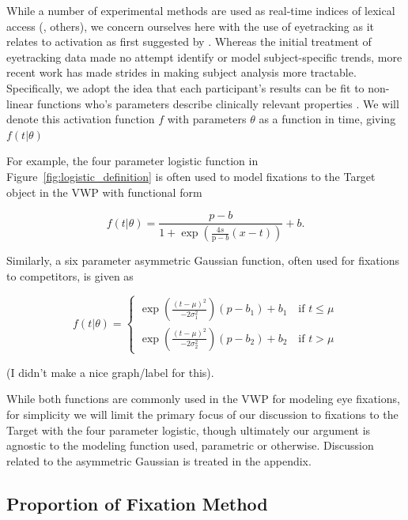 While a number of experimental methods are used as real-time indices of lexical access (\cite{Spivey2005}, others), we concern ourselves here with the use of eyetracking as it relates to activation as first suggested by \cite{allopenna1998tracking}. Whereas the initial treatment of eyetracking data made no attempt identify or model subject-specific trends, more recent work has made strides in making subject analysis more tractable. Specifically, we adopt the idea that each participant's results can be fit to non-linear functions who's parameters describe clinically relevant properties \cite{mcmurray2010individual}. We will denote this activation function $f$ with parameters $\theta$ as a function in time, giving $f(t|\theta)$

For example, the four parameter logistic function in Figure~\ref{fig:logistic_definition} is often used to model fixations to the Target object in the VWP with functional form

\begin{equation} \label{eq:logistic}
f(t|\theta) = \frac{p-b}{1 + \exp \left(\frac{4s}{\text{p}-b} (x - t) \right)} + b.
\end{equation}

Similarly, a six parameter asymmetric Gaussian function, often used for fixations to competitors, is given as

\begin{equation} \label{eq:dg}
f(t|\theta) = \begin{cases}
\exp \left( \frac{(t - \mu)^2}{-2\sigma_1^2} \right) (p - b_1) + b_1 \quad \text{if } t \leq \mu \\
\exp \left( \frac{(t - \mu)^2}{-2\sigma_2^2} \right) (p - b_2) + b_2 \quad \text{if } t > \mu
\end{cases}
\end{equation}

(I didn't make a nice graph/label for this). 

While both functions are commonly used in the VWP for modeling eye fixations, for simplicity we will limit the primary focus of our discussion to fixations to the Target with the four parameter logistic, though ultimately our argument is agnostic to the modeling function used, parametric or otherwise. Discussion related to the asymmetric Gaussian is treated in the appendix.


\subsection{Proportion of Fixation Method}

